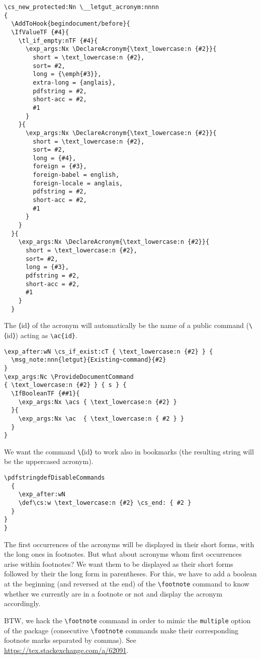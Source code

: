 \documentclass{letgut}
\begin{document}
\begin{lstlisting}
\cs_new_protected:Nn \__letgut_acronym:nnnn
{
  \AddToHook{begindocument/before}{
  \IfValueTF {#4}{
    \tl_if_empty:nTF {#4}{
      \exp_args:Nx \DeclareAcronym{\text_lowercase:n {#2}}{
        short = \text_lowercase:n {#2},
        sort= #2,
        long = {\emph{#3}},
        extra-long = {anglais},
        pdfstring = #2,
        short-acc = #2,
        #1
      }
    }{
      \exp_args:Nx \DeclareAcronym{\text_lowercase:n {#2}}{
        short = \text_lowercase:n {#2},
        sort= #2,
        long = {#4},
        foreign = {#3},
        foreign-babel = english,
        foreign-locale = anglais,
        pdfstring = #2,
        short-acc = #2,
        #1
      }
    }
  }{
    \exp_args:Nx \DeclareAcronym{\text_lowercase:n {#2}}{
      short = \text_lowercase:n {#2},
      sort= #2,
      long = {#3},
      pdfstring = #2,
      short-acc = #2,
      #1
    }
  }
\end{lstlisting}
The ⟨id⟩ of the acronym will automatically be the name of a public command
(\lstinline+\+​⟨id⟩) acting as \lstinline+\ac{id}+.
\begin{lstlisting}
\exp_after:wN \cs_if_exist:cT { \text_lowercase:n {#2} } {
  \msg_note:nnn{letgut}{Existing~command}{#2}
}
\exp_args:Nc \ProvideDocumentCommand
{ \text_lowercase:n {#2} } { s } {
  \IfBooleanTF {##1}{
    \exp_args:Nx \acs { \text_lowercase:n {#2} }
  }{
    \exp_args:Nx \ac  { \text_lowercase:n { #2 } }
  }
}
\end{lstlisting}
We want the command \lstinline+\+​⟨id⟩ to work also in bookmarks (the resulting string will
be the uppercased acronym).
\begin{lstlisting}
\pdfstringdefDisableCommands
  {
    \exp_after:wN
    \def\cs:w \text_lowercase:n {#2} \cs_end: { #2 }
  }
}
}
\end{lstlisting}

The first occurrences of the acronyms will be displayed in their short forms,
with the long ones in footnotes. But what about acronyms whom first occurrences
arise within footnotes? We want them to be displayed as their short forms
followed by their the long form in parentheses. For this, we have to add
a boolean at the beginning (and reversed at the end) of the \lstinline+\footnote+ command
to know whether we currently are in a footnote or not and display the acronym
accordingly.

BTW, we hack the \lstinline+\footnote+ command in order to mimic the \lstinline+multiple+ option of
the  package (consecutive \lstinline+\footnote+ commands make their
corresponding footnote marks separated by commas). See
\url{https://tex.stackexchange.com/a/62091}.
\end{document}

